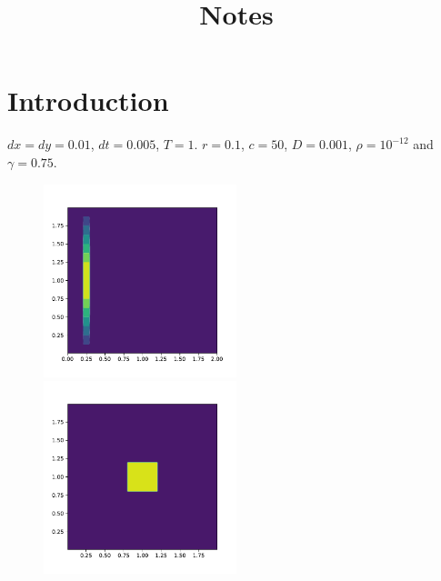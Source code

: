 \documentclass[letterpaper,12pt]{article}
\theoremstyle{plain}
\theoremstyle{remark}
\theoremstyle{remark}
\theoremstyle{remark}
\numberwithin{equation}{section}
\begin{document}
\title{Notes}

\author{}

\maketitle



\section{Introduction}
$dx = dy = 0.01$, $dt = 0.005$, $T = 1$. $r = 0.1$, $c = 50$, $D = 0.001$, $\rho = 10^{-12}$ and $\gamma = 0.75$.
\begin{figure}
  \includegraphics[width=0.5\textwidth]{1/m1}
  \includegraphics[width=0.5\textwidth]{1/s}
\end{figure}
\end{document}
